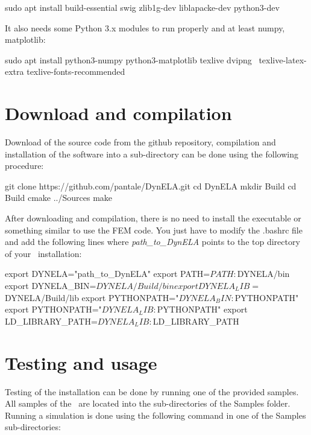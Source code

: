 \begin{BashListing}[numbers=none]
sudo apt install build-essential swig zlib1g-dev liblapacke-dev python3-dev
\end{BashListing}

It also needs some Python 3.x modules to run properly and at least numpy, matplotlib:

\begin{BashListing}[numbers=none]
sudo apt install python3-numpy python3-matplotlib texlive dvipng \
texlive-latex-extra texlive-fonts-recommended
\end{BashListing}

\section{Download and compilation}

Download of the source code from the github repository, compilation and installation of the software into a sub-directory can be done using the following procedure:

\begin{BashListing}[numbers=none]
git clone https://github.com/pantale/DynELA.git
cd DynELA
mkdir Build
cd Build
cmake ../Sources
make
\end{BashListing}

After downloading and compilation, there is no need to install the executable or something similar to use the FEM code. You just have to modify the \textsf{.bashrc} file and add the following lines where \emph{path\_to\_DynELA} points to the top directory of your \DynELA~installation:

\begin{BashListing}[numbers=none]
export DYNELA="path_to_DynELA"
export PATH=$PATH:$DYNELA/bin
export DYNELA_BIN=$DYNELA/Build/bin
export DYNELA_LIB=$DYNELA/Build/lib
export PYTHONPATH="$DYNELA_BIN:$PYTHONPATH"
export PYTHONPATH="$DYNELA_LIB:$PYTHONPATH"
export LD_LIBRARY_PATH=$DYNELA_LIB:$LD_LIBRARY_PATH
\end{BashListing}

\section{Testing and usage}

Testing of the installation can be done by running one of the provided samples. All samples of the \DynELA~are located into the sub-directories of the Samples folder. Running a simulation is done using the following command in one of the Samples sub-directories:

